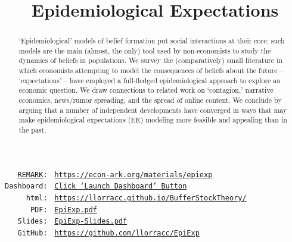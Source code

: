 {    \title{Epidemiological Expectations}
    \renewcommand{\forcedate}{February 5, 2022}
    \maketitle
    \hypertarget{abstract}{}
    \begin{abstract}
      `Epidemiological' models of belief formation put social interactions at their core; such models are the main (almost, the only) tool used by non-economists to study the dynamics of beliefs in populations.  We survey the (comparatively) small literature in which economists attempting to model the consequences of beliefs about the future -- `expectations' -- have employed a full-fledged epidemiological approach to explore an economic question.  We draw connections to related work on `contagion,' narrative economics, news/rumor spreading, and the spread of online content. We conclude by arguing that a number of independent developments have converged in ways that may make epidemiological expectations (EE) modeling more feasible and appealing than in the past.
    \end{abstract}

    \vspace{0.5in}
    \newcommand{\owner}{llorracc}
    \newcommand{\REMARK}{\href{https://github.com/econ-ark/REMARK}{REMARK}}
    \begin{small}
      \parbox{0.9\textwidth}{
        \begin{center}
          \begin{tabbing}
            \texttt{~~~\REMARK:~} \= \= \texttt{\url{https://econ-ark.org/materials/epiexp}} \\ 
            \texttt{Dashboard:~} \> \> \texttt{\href{https://econ-ark.org/materials/epiexp?launch}{Click `Launch Dashboard' Button}} \\
            \texttt{~~~~~html:~} \> \> \texttt{\href{https://\owner.github.io/EpiExp}{https://\owner.github.io/BufferStockTheory/}} \\ %
            \texttt{~~~~~~PDF:~} \> \> \texttt{\href{https://github.com/\owner/EpiExp/blob/master/EpiExp.pdf}{EpiExp.pdf}} \\ 
            \texttt{~~~Slides:~} \> \> \texttt{\href{https://github.com/\owner/EpiExp/blob/master/EpiExp-Slides.pdf}{EpiExp-Slides.pdf}} \\
            \texttt{~~~GitHub:~} \> \> \texttt{\href{https://github.com/\owner/EpiExp}{https://github.com/\owner/EpiExp}} \\
          \end{tabbing}
        \end{center}
      }
    \end{small}

}

